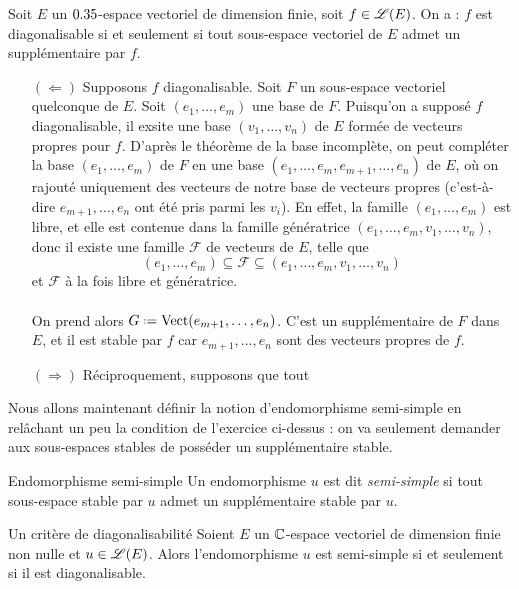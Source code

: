\begin{prop}{}
    Soit $E$ un $0.35$-espace vectoriel de dimension finie, soit $f \in \mathscr{L}(E)$. On a : $f$ est diagonalisable si et seulement si tout sous-espace vectoriel de $E$ admet un supplémentaire par $f$.
\end{prop}

\begin{preuve}
    \begin{itemize}
        \item[$(\Leftarrow)$] Supposons $f$ diagonalisable. Soit $F$ un sous-espace vectoriel quelconque de $E$. Soit $(e_1, \dots, e_m)$ une base de $F$. Puisqu'on a supposé $f$ diagonalisable, il exsite une base $(v_1, \dots, v_n)$ de $E$ formée de vecteurs propres pour $f$. D'après le théorème de la base incomplète, on peut compléter la base $(e_1, \dots, e_m)$ de $F$ en une base $(e_1, \dots, e_m, e_{m+1}, \dots, e_n)$ de $E$, où on rajouté uniquement des vecteurs de notre base de vecteurs propres (c'est-à-dire $e_{m+1}, \dots, e_n$ ont été pris parmi les $v_i$). En effet, la famille $(e_1, \dots, e_m)$ est libre, et elle est contenue dans la famille génératrice $(e_1, \dots, e_m, v_1, \dots, v_n)$, donc il existe une famille $\mathcal{F}$ de vecteurs de $E$, telle que 
        $$(e_1, \dots, e_m) \subseteq \mathcal{F} \subseteq (e_1, \dots, e_m, v_1, \dots, v_n)$$
        et $\mathcal{F}$ à la fois libre et génératrice. \\
        [il manque une explication supp] \\
        On prend alors $G \defeq \Vect(e_{m+1}, \dots, e_n)$. C'est un supplémentaire de $F$ dans $E$, et il est stable par $f$ car $e_{m+1}, \dots, e_n$ sont des vecteurs propres de $f$.
        \item[$(\Rightarrow)$] Réciproquement, supposons que tout 
    \end{itemize}
\end{preuve}

Nous allons maintenant définir la notion d'endomorphisme semi-simple en relâchant un peu la
condition de l'exercice ci-dessus : on va seulement demander aux sous-espaces stables de posséder
un supplémentaire stable.

\begin{defi}{Endomorphisme semi-simple}
    Un endomorphisme $u$ est dit \emph{semi-simple} si tout sous-espace stable par $u$ admet un supplémentaire stable par $u$.
\end{defi}

\begin{prop}{Un critère de diagonalisabilité}
    Soient $E$ un $\mathbb{C}$-espace vectoriel de dimension finie non nulle et $u \in \mathscr{L}(E)$. Alors l'endomorphisme $u$ est semi-simple si et seulement si il est diagonalisable.
\end{prop}

